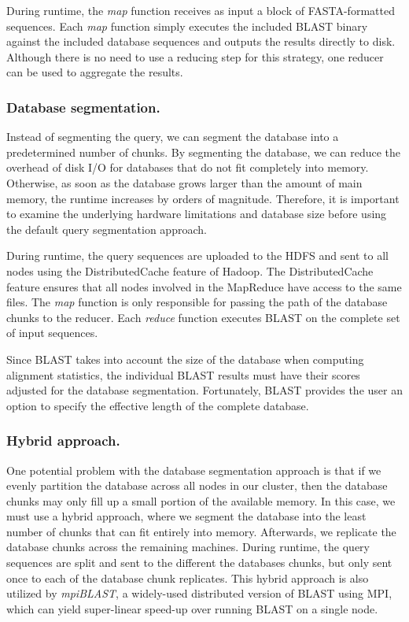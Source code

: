\documentclass[12pt,\mydriver]{thesis}
\begin{document}
During runtime, the \emph{map} function receives as input a block of FASTA-formatted sequences.
Each \emph{map} function simply executes the included BLAST binary against the included database sequences and outputs the results directly to disk.
Although there is no need to use a reducing step for this strategy, one reducer can be used to aggregate the results.

\subsubsection{Database segmentation.}

Instead of segmenting the query, we can segment the database into a predetermined number of chunks.
By segmenting the database, we can reduce the overhead of disk I/O for databases that do not fit completely into memory.
Otherwise, as soon as the database grows larger than the amount of main memory, the runtime increases by orders of magnitude\cite{darling2003design}.
Therefore, it is important to examine the underlying hardware limitations and database size before using the default query segmentation approach.

During runtime, the query sequences are uploaded to the HDFS and sent to all nodes using the DistributedCache feature of Hadoop.  The DistributedCache feature ensures that all nodes involved in the MapReduce have access to the same files.  The \emph{map} function is only responsible for passing the path of the database chunks to the reducer.  Each \emph{reduce} function executes BLAST on the complete set of input sequences.

Since BLAST takes into account the size of the database when computing alignment statistics, the individual BLAST results must have their scores adjusted for the database segmentation.
Fortunately, BLAST provides the user an option to specify the effective length of the complete database.

\subsubsection{Hybrid approach.}
One potential problem with the database segmentation approach is that if we evenly partition the database across all nodes in our cluster, then the database chunks may only fill up a small portion of the available memory.
In this case, we must use a hybrid approach, where we segment the database into the least number of chunks that can fit entirely into memory.
Afterwards, we replicate the database chunks across the remaining machines.
During runtime, the query sequences are split and sent to the different the databases chunks, but only sent once to each of the database chunk replicates.
This hybrid approach is also utilized by \emph{mpiBLAST}\cite{darling2003design}, a widely-used distributed version of BLAST using MPI, which can yield super-linear speed-up over running BLAST on a single node.
\end{document}
